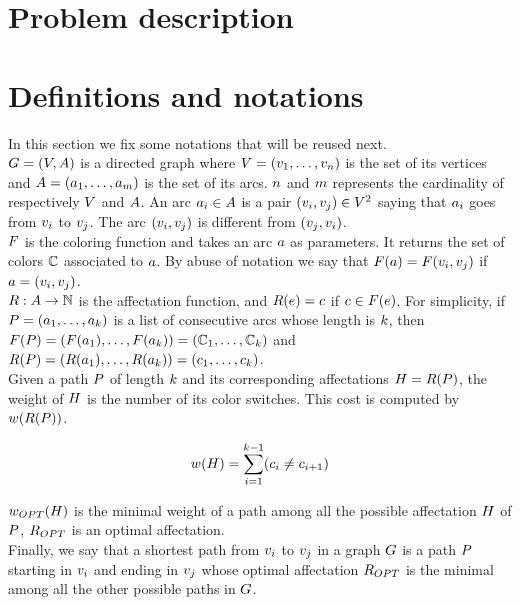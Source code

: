\section{Problem description}

\section{Definitions and notations}

In this section we fix some notations that will be reused next.\\
$G = (V, A)$ is a directed graph where $V = (v_1,\ldots,v_{n})$ is the set of its vertices and $A = (a_1,\ldots,a_{m})$ is the set of its arcs. $n$ and $m$ represents the cardinality of respectively $V$ and $A$. An arc $a_i \in A$ is a pair $(v_i, v_j) \in V^2$ saying that $a_i$ goes from $v_i$ to $v_j$. The arc $(v_i, v_j)$ is different from $(v_j, v_i)$.\\
$F$ is the coloring function and takes an arc $a$ as parameters. It returns the set of colors $\mathbb{C}$ associated to $a$. By abuse of notation we say that $F(a) = F(v_i, v_j)$ if $a = (v_i, v_j)$.\\
$R: A \rightarrow \mathbb{N} $ is the affectation function, and $R(e) = c$ if $c \in F(e)$. For simplicity, if $P = (a_1,\ldots,a_{k})$ is a list of consecutive arcs whose length is $k$, then $F(P) = (F(a_1), \dots, F(a_k)) = (\mathbb{C}_1,\ldots,\mathbb{C}_{k})$ and $R(P) = (R(a_1), \dots, R(a_k))  = (c_1,\ldots,c_{k})$.\\
Given a path $P$ of length $k$ and its corresponding affectations $H = R(P)$, the weight of $H$ is the number of its color switches. This cost is computed by $w(R(P))$.

$$ w(H) = \sum\limits_{i = 1}^{k-1} (c_i \neq c_{i+1}) $$

$w_{OPT}(H)$ is the minimal weight of a path among all the possible affectation $H$ of $P$, $R_{OPT}$ is an optimal affectation.\\
Finally, we say that a shortest path from $v_i$ to $v_j$ in a graph $G$ is a path $P$ starting in $v_i$ and ending in $v_j$ whose optimal affectation $R_{OPT}$ is the minimal among all the other possible paths in $G$.